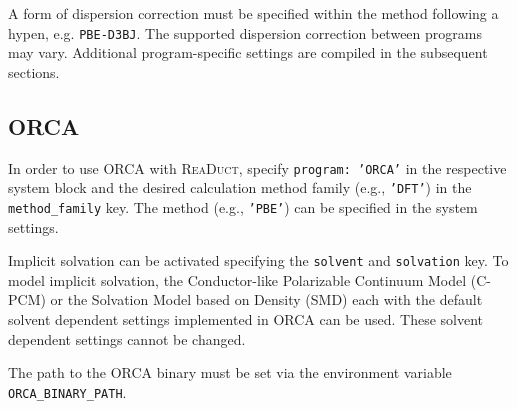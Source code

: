 \documentclass[]{tufte-book}
\begin{document}
A form of dispersion correction must be specified within the method following a hypen, e.g. \texttt{PBE-D3BJ}. The supported dispersion correction between programs may vary. Additional program-specific settings are compiled in the subsequent sections.

\subsection{\textsc{ORCA}}

In order to use \textsc{ORCA} with \textsc{ReaDuct}, specify \texttt{program: 'ORCA'} in the respective system block and the desired
calculation method family (e.g., \texttt{'DFT'}) in the \texttt{method\_family} key.
The method (e.g., \texttt{'PBE'}) can be specified in the system settings.

Implicit solvation can be activated specifying the \texttt{solvent} and \texttt{solvation} key.
To model implicit solvation, the Conductor-like Polarizable Continuum Model\cite{cpcm} (C-PCM) or the Solvation Model based on Density\cite{smd} (SMD) each with the default solvent dependent settings implemented in \textsc{ORCA} can be used.
These solvent dependent settings cannot be changed.

The path to the \textsc{ORCA} binary must be set via the environment variable \texttt{ORCA\_BINARY\_PATH}.
\end{document}
